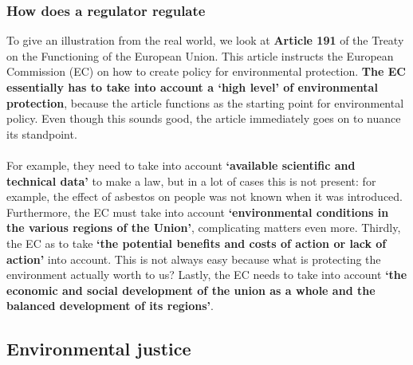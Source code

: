 \documentclass[../summary.tex]{subfiles}
\begin{document}
		\subsubsection{How does a regulator regulate}
			To give an illustration from the real world, we look at \textbf{Article 191} of the Treaty on the Functioning of the European Union. This article instructs the European Commission (EC) on how to create policy for environmental protection. \textbf{The EC essentially has to take into account a `high level' of environmental protection}, because the article functions as the starting point for environmental policy. Even though this sounds good, the article immediately goes on to nuance its standpoint.\\
			\\
			 For example, they need to take into account \textbf{`available scientific and technical data'} to make a law, but in a lot of cases this is not present: for example, the effect of asbestos on people was not known when it was introduced.  Furthermore, the EC must take into account \textbf{`environmental conditions in the various regions of the Union'}, complicating matters even more. Thirdly, the EC as to take \textbf{`the potential benefits and costs of action or lack of action'} into account. This is not always easy because what is protecting the environment actually worth to us? Lastly, the EC needs to take into account \textbf{`the economic and social development of the union as a whole and the balanced development of its regions'}.
	
	\subsection{Environmental justice}
\end{document}
